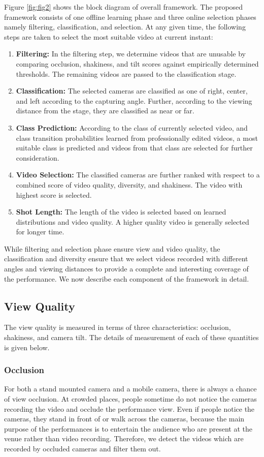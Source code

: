 \documentclass{sig-alternate}
\begin{document}
Figure \ref{fig:fig2} shows the block diagram of overall framework. The proposed framework consists of one offline learning phase and three online selection phases namely filtering, classification, and selection. At any given time, the following steps are taken to select the most suitable video at current instant:
\begin{enumerate}
    \item \textbf{Filtering:} In the filtering step, we determine videos that are unusable by comparing occlusion, shakiness, and tilt scores against empirically determined thresholds. The remaining
    videos are passed to the classification stage.
    \item \textbf{Classification:} The selected cameras are classified as one of right, center, and left according to the capturing angle. Further, according to the viewing distance from the stage, they are classified as near or far.
    \item \textbf{Class Prediction:} According to the class of currently selected video, and class transition probabilities learned from professionally edited videos, a most suitable class is predicted
    and videos from that class are selected for further consideration.
    \item \textbf{Video Selection:} The classified cameras are further ranked with respect to a combined score of video quality, diversity, and shakiness. The video with highest score is selected.
    \item \textbf{Shot Length:} The length of the video is selected based on learned distributions and video quality. A higher quality video is generally selected for longer time.
\end{enumerate}
While filtering and selection phase ensure view and video quality, the classification and diversity ensure that we select videos recorded with different angles and viewing distances to provide a complete and interesting coverage of the performance. We now
describe each component of the framework in detail.

\subsection{View Quality}
The view quality is measured in terms of three characteristics: occlusion, shakiness, and camera tilt. The details of measurement of each of these quantities is given below.
\subsubsection{Occlusion}
For both a stand mounted camera and a mobile camera, there is always a chance of view occlusion. At crowded places, people sometime do not notice the cameras recording the video and occlude the performance view. Even if people notice the cameras,
they stand in front of or walk across the cameras, because the main purpose of the performances is to entertain the audience who are present at the venue rather than video recording. Therefore, we detect
the videos which are recorded by occluded cameras and filter them out.
\end{document}
